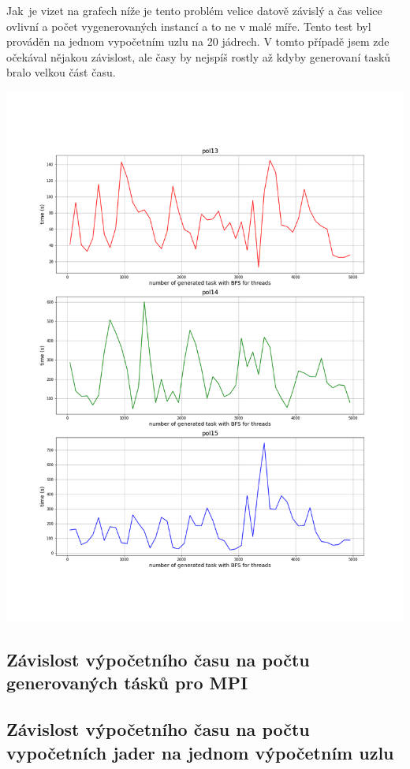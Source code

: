 \documentclass[epsf,epic,eepic,eepicemu]{article}
\begin{document}
Jak\ je vizet na grafech níže je tento problém velice datově závislý a čas velice ovlivní a počet vygenerovaných instancí a to ne v malé míře. Tento test byl prováděn na jednom vypočetním uzlu na 20 jádrech. V tomto případě jsem zde očekával nějakou závislost, ale časy by nejspíš rostly až kdyby generovaní tasků bralo velkou část času.
\begin{center}
    \includegraphics[scale=0.44]{nN.png}
     \label{obr2}
    \end{center}


\subsection{Závislost výpočetního času na počtu generovaných tásků pro MPI}

\subsection{Závislost výpočetního času na počtu vypočetních jader na jednom výpočetním uzlu}
\end{document}
